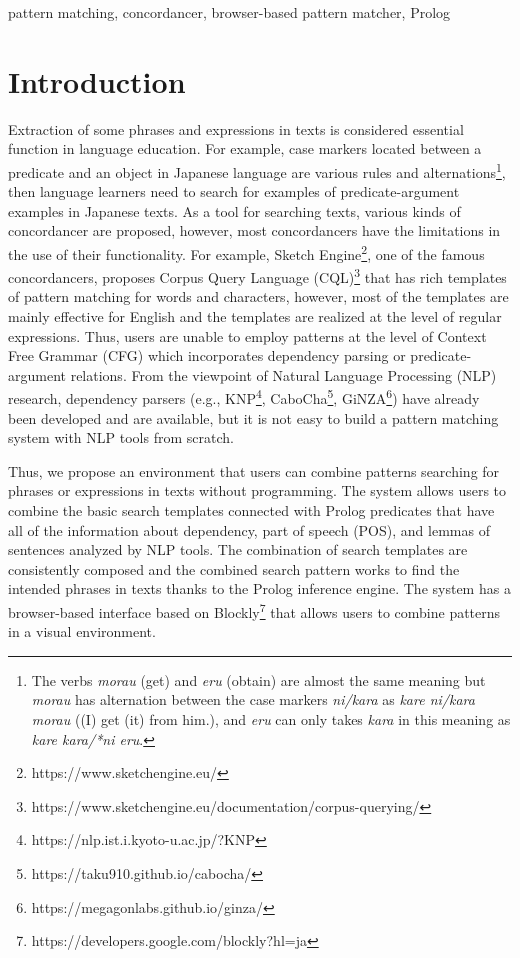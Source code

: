 \documentclass[conference]{IEEEtran}
\begin{document}
\begin{IEEEkeywords}
  pattern matching, concordancer, browser-based pattern matcher, Prolog
\end{IEEEkeywords}

\section{Introduction}
Extraction of some phrases and expressions in texts is considered essential function in language education.
For example, case markers located between a predicate and an object in Japanese language are various
rules and alternations\footnote{The verbs {\it morau} (get) and {\it eru} (obtain) are almost the same meaning
but {\it morau} has alternation between the case markers {\it ni/kara} as {\it kare ni/kara morau}
((I) get (it) from him.), and 
{\it eru} can only takes {\it kara} in this meaning as {\it kare kara/*ni eru}.},
then language learners need to search for examples of predicate-argument
examples in Japanese texts. 
As a tool for searching texts, various kinds of concordancer are proposed, however, 
most concordancers have the limitations in the use of their functionality.
For example, Sketch Engine\footnote{https://www.sketchengine.eu/}, one of the famous concordancers,
proposes Corpus Query Language (CQL)\footnote{https://www.sketchengine.eu/documentation/corpus-querying/}
that has rich templates of pattern matching for words and characters, however, 
most of the templates are mainly effective for English and the templates are realized 
at the level of regular expressions. Thus, users are unable to employ patterns at the level of Context
Free Grammar (CFG) which incorporates dependency parsing or predicate-argument relations.
From the viewpoint of Natural Language Processing (NLP) research,
dependency parsers (e.g., KNP\footnote{https://nlp.ist.i.kyoto-u.ac.jp/?KNP}, CaboCha\footnote{https://taku910.github.io/cabocha/}, GiNZA\footnote{https://megagonlabs.github.io/ginza/}) have already been developed and are available, but it is not easy to
build a pattern matching system with NLP tools from scratch. 

Thus, we propose an environment that users can combine patterns
searching for phrases or expressions in texts without programming.
The system allows users to combine the basic search templates
connected with Prolog predicates that have all of the information
about dependency, part of speech (POS), and lemmas of sentences analyzed by NLP tools. 
The combination of search templates are consistently composed and the
combined search pattern works to find the intended phrases in texts thanks to
the Prolog inference engine. 
The system has a browser-based interface based on Blockly\footnote{https://developers.google.com/blockly?hl=ja}
that allows users to combine patterns in a visual environment. 
\end{document}
